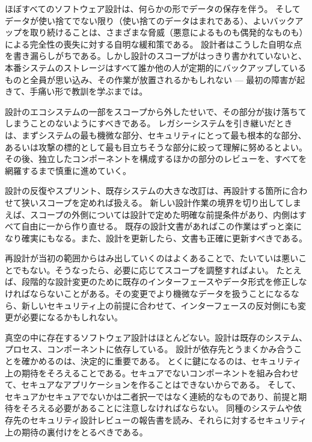 \documentclass[uplatex]{jsarticle}
\def\label#1{}%
\begin{document}
\begin{exa}[誰もが他の誰かがやっていると思うバックアップ]\label{exa:ch6-backup-falls-through}
ほぼすべてのソフトウェア設計は、何らかの形でデータの保存を伴う。
そしてデータが使い捨てでない限り（使い捨てのデータはまれである）、よいバックアップを取り続けることは、さまざまな脅威（悪意によるものも偶発的なものも）による完全性の喪失に対する自明な緩和策である。
設計者はこうした自明な点を書き漏らしがちである。しかし設計のスコープがはっきり書かれていないと、本番システムのストレージはすべて誰か他の人が定期的にバックアップしているものと全員が思い込み、その作業が放置されるかもしれない --- 最初の障害が起きて、手痛い形で教訓を学ぶまでは。
\end{exa}

設計のエコシステムの一部をスコープから外したせいで、その部分が抜け落ちてしまうことのないようにすべきである。
レガシーシステムを引き継いだときは、まずシステムの最も機微な部分、セキュリティにとって最も根本的な部分、あるいは攻撃の標的として最も目立ちそうな部分に絞って理解に努めるとよい。
その後、独立したコンポーネントを構成するほかの部分のレビューを、すべてを網羅するまで慎重に進めていく。

設計の反復やスプリント、既存システムの大きな改訂は、再設計する箇所に合わせて狭いスコープを定めれば扱える。
新しい設計作業の境界を切り出してしまえば、スコープの外側については設計で定めた明確な前提条件があり、内側はすべて自由に一から作り直せる。
既存の設計文書があればこの作業はずっと楽になり確実にもなる。また、設計を更新したら、文書も正確に更新すべきである。

再設計が当初の範囲からはみ出していくのはよくあることで、たいていは悪いことでもない。そうなったら、必要に応じてスコープを調整すればよい。
たとえば、段階的な設計変更のために既存のインターフェースやデータ形式を修正しなければならないことがある。その変更でより機微なデータを扱うことになるなら、新しいセキュリティ上の前提に合わせて、インターフェースの反対側にも変更が必要になるかもしれない。

真空の中に存在するソフトウェア設計はほとんどない。設計は既存のシステム、プロセス、コンポーネントに依存している。
設計が依存先とうまくかみ合うことを確かめるのは、決定的に重要である。
とくに鍵になるのは、セキュリティ上の期待をそろえることである。セキュアでないコンポーネントを組み合わせて、セキュアなアプリケーションを作ることはできないからである。
そして、セキュアかセキュアでないかは二者択一ではなく連続的なものであり、前提と期待をそろえる必要があることに注意しなければならない。
同種のシステムや依存先のセキュリティ設計レビューの報告書を読み、それらに対するセキュリティ上の期待の裏付けをとるべきである。
\end{document}
